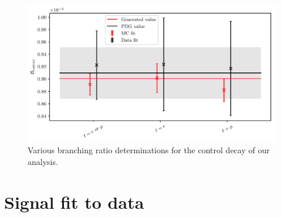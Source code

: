 \begin{figure}[H]
	\centering
	\captionsetup{width=0.8\linewidth}
	\includegraphics[width=\linewidth]{fig/br_plot}
	\caption{Various branching ratio determinations for the control decay of our analysis.}
	\label{fig:br_plot}
\end{figure}

\section{Signal fit to data}